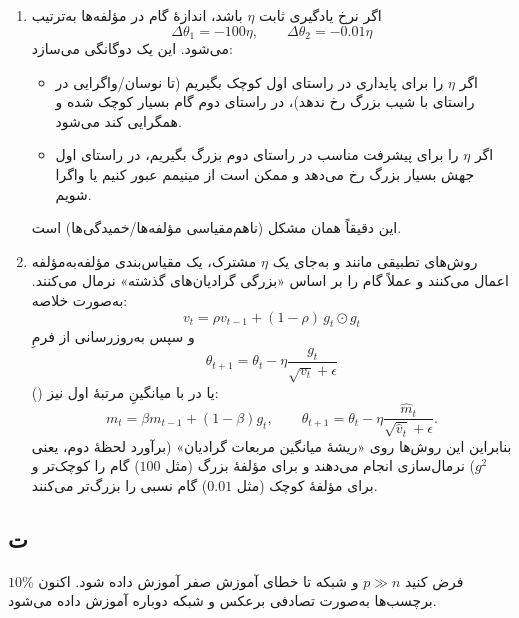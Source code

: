 \begin{enumerate}
\item[(۱)]
اگر نرخ یادگیری ثابت $\eta$ باشد، اندازهٔ گام در مؤلفه‌ها به‌ترتیب
\[
\Delta \theta_1 = -100\eta, \qquad \Delta \theta_2 = -0.01\eta
\]
می‌شود. این یک دوگانگی می‌سازد:
\begin{itemize}
    \item اگر $\eta$ را برای پایداری در راستای اول کوچک بگیریم (تا نوسان/واگرایی در راستای با شیب بزرگ رخ ندهد)، در راستای دوم گام بسیار کوچک شده و همگرایی کند می‌شود.
    \item اگر $\eta$ را برای پیشرفت مناسب در راستای دوم بزرگ بگیریم، در راستای اول جهش بسیار بزرگ رخ می‌دهد و ممکن است از مینیمم عبور کنیم یا واگرا شویم.
\end{itemize}
این دقیقاً همان مشکل  (ناهم‌مقیاسی مؤلفه‌ها/خمیدگی‌ها) است.

\item[(۲)]
روش‌های تطبیقی مانند  و  به‌جای یک $\eta$ مشترک، یک مقیاس‌بندی مؤلفه‌به‌مؤلفه اعمال می‌کنند و عملاً گام را بر اساس «بزرگی گرادیان‌های گذشته» نرمال می‌کنند. به‌صورت خلاصه:
\[
v_t = \rho v_{t-1} + (1-\rho)\, g_t \odot g_t
\]
و سپس به‌روزرسانی از فرمِ
\[
\theta_{t+1} = \theta_t - \eta \frac{g_t}{\sqrt{v_t}+\epsilon}
\]
()
یا در  با میانگینِ مرتبهٔ اول نیز:
\[
m_t = \beta m_{t-1} + (1-\beta) g_t, \qquad
\theta_{t+1} = \theta_t - \eta \frac{\hat{m}_t}{\sqrt{\hat{v}_t}+\epsilon}.
\]
بنابراین این روش‌ها روی «ریشهٔ میانگین مربعات گرادیان» (برآورد لحظهٔ دوم، یعنی $g^2$) نرمال‌سازی انجام می‌دهند و برای مؤلفهٔ بزرگ (مثل $100$) گام را کوچک‌تر و برای مؤلفهٔ کوچک (مثل $0.01$) گام نسبی را بزرگ‌تر می‌کنند.
\end{enumerate}

\subsection*{ت}
فرض کنید $p \gg n$ و شبکه تا خطای آموزش صفر آموزش داده شود. اکنون $10\%$ برچسب‌ها به‌صورت تصادفی برعکس و شبکه دوباره آموزش داده می‌شود.

